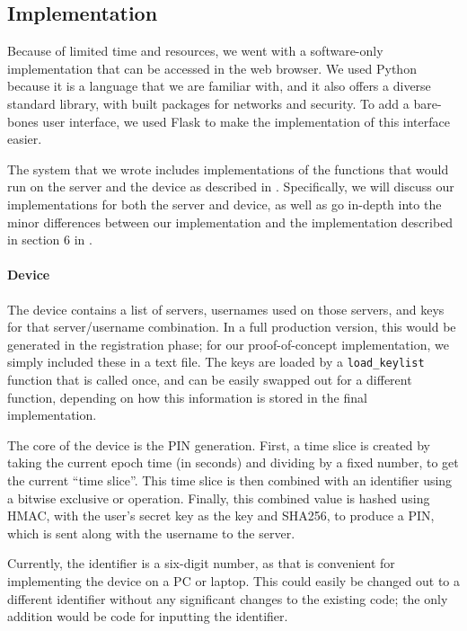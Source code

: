 \documentclass[11pt]{article}
\begin{document}
\subsection{Implementation}

Because of limited time and resources, we went with a software-only
implementation that can be accessed in the web browser. We used Python
because it is a language that we are familiar with, and it also offers a
diverse standard library, with built packages for networks and security.
To add a bare-bones user interface, we used Flask to make the
implementation of this interface easier. 

The system that we wrote includes implementations of the functions that
would run on the server and the device as described in
\cite{shirvanian2d2fa}. Specifically, we will discuss our
implementations for both the server and device, as well as go in-depth
into the minor differences between our implementation and the
implementation described in section 6 in \cite{shirvanian2d2fa}.

\paragraph{Device}

The device contains a list of servers, usernames used on those servers,
and keys for that server/username combination. In a full production
version, this would be generated in the registration phase; for our
proof-of-concept implementation, we simply included these in a text
file. The keys are loaded by a \texttt{load\_keylist} function that is
called once, and can be easily swapped out for a different function,
depending on how this information is stored in the final implementation.

The core of the device is the PIN generation. First, a time slice is
created by taking the current epoch time (in seconds) and dividing by a
fixed number, to get the current ``time slice''. This time slice is then
combined with an identifier using a bitwise exclusive or operation.
Finally, this combined value is hashed using HMAC, with the user's
secret key as the key and SHA256, to produce a PIN, which is sent along
with the username to the server.

Currently, the identifier is a six-digit number, as that is convenient
for implementing the device on a PC or laptop. This could easily be
changed out to a different identifier without any significant changes to
the existing code; the only addition would be code for inputting the
identifier.
\end{document}

